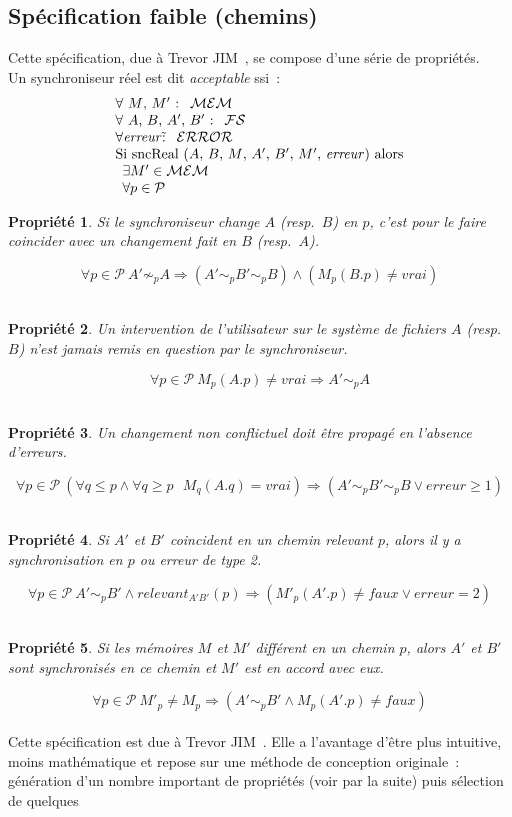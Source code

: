 \documentclass[11pt]{report}
\newtheorem{propri}{Propri\'et\'e}
\newcommand{\fs}{\ensuremath{\mathcal{FS}}}
\newcommand{\error}{\ensuremath{\mathcal{ERROR}}}
\newcommand{\mem}{\ensuremath{\mathcal{MEM}}}
\newcommand{\path}{\ensuremath{\mathcal{P}}}
\newcommand{\trevor}{Trevor JIM}
\newcommand{\prop}[3]{
\begin{propri}
#1
\end{propri}
\begin{equation} \label{#2}
#3
\end{equation}\\}
\begin{document}
{\subsection{Sp\'ecification faible (chemins)}
Cette sp\'ecification, due \`a \trevor\ , se compose d'une s\'erie de
propri\'et\'es.\\
Un synchroniseur r\'eel est dit \emph{acceptable} ssi~:
\[
\begin{array}{ll}
\forall \mbox{\ $M$, $M'$~: \ } \mem\ \\
\forall \mbox{\ $A$, $B$, $A'$, $B'$~: \ } \fs\ \\
\forall \mathit{erreur} \mbox{\~: \ } \error\ \\
\mbox{Si sncReal ($A$, $B$, $M$, $A'$, $B'$, $M'$, $\mathit{erreur}$) alors}\\
  \begin{array}{l} 
   \exists M' \in \mem\ \\
   \forall p \in \mathcal{P}
  \end{array}
\end{array} \\
\]
\prop{
Si le synchroniseur change $A$ (resp.\ $B$) en $p$, c'est pour le faire
coincider avec un changement fait en $B$ (resp.\ $A$).
}
{prop1}
{\forall p \in \path\ A' \not\sim_{p} A \Rightarrow (A' \sim_{p} B' \sim_{p} B) \wedge 
(M_{p}(B.p) \neq vrai)}
\prop{
Un intervention de l'utilisateur sur le syst\`eme de fichiers $A$ (resp.\ $B$)
n'est jamais remis en question par le synchroniseur.}
{prop2}
{\forall p \in \path\ M_{p}(A.p) \neq vrai \Rightarrow A' \sim_{p} A}
\prop{
Un changement non conflictuel doit \^etre propag\'e en l'absence d'erreurs.}
{prop3}
{\forall p \in \path\ (\forall q \leq p \wedge \forall q \geq p \mbox{\ } M_{q}(A.q) = vrai)
  \Rightarrow (A' \sim_{p} B' \sim_{p} B \vee \mathit{erreur} \geq 1)}
\prop{
Si $A'$ et $B'$ coincident en un chemin relevant $p$, alors il y a 
synchronisation en $p$ ou erreur de type 2.}
{prop4}
{\forall p \in \path\ A' \sim_{p} B' \wedge \mathit{relevant}_{A'B'}(p) \Rightarrow (M'_{p}(A'.p) \neq faux \vee \mathit{erreur} = 2)}
\prop{
Si les m\'emoires $M$ et $M'$ diff\'erent en un chemin $p$, alors $A'$ et $B'$
sont synchronis\'es en ce chemin et $M'$ est en accord avec eux.
}
{prop5}
{\forall p \in \path\ M'_{p} \neq M_{p} \Rightarrow (A' \sim_{p} B' \wedge M_{p}(A'.p) \neq faux)}
Cette sp\'ecification est due \`a \trevor\ . Elle a l'avantage d'\^etre plus intuitive,
moins math\'ematique et repose sur une m\'ethode de conception originale~: g\'en\'eration
d'un nombre important de propri\'et\'es (voir par la suite) puis s\'election de quelques
}
\end{document}
